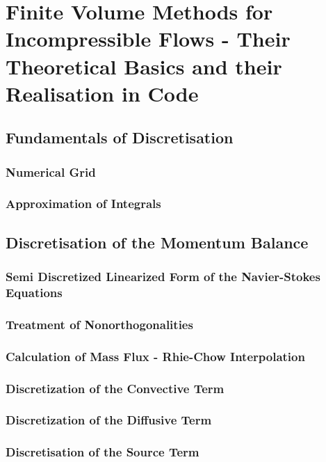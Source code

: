 \documentclass[article,type=msc,colorback,accentcolor=tud2a]{tudthesis}
\begin{document}
  \section{Finite Volume Methods for Incompressible Flows - Their Theoretical Basics and their Realisation in Code}

    \subsection{Fundamentals of Discretisation}
      
      \subsubsection{Numerical Grid}
      \subsubsection{Approximation of Integrals}

    \subsection{Discretisation of the Momentum Balance}
      
      \subsubsection{Semi Discretized Linearized Form of the Navier-Stokes Equations}
      \subsubsection{Treatment of Nonorthogonalities}
      \subsubsection{Calculation of Mass Flux - Rhie-Chow Interpolation}
      \subsubsection{Discretization of the Convective Term}
      \subsubsection{Discretization of the Diffusive Term}
      \subsubsection{Discretisation of the Source Term}
\end{document}
